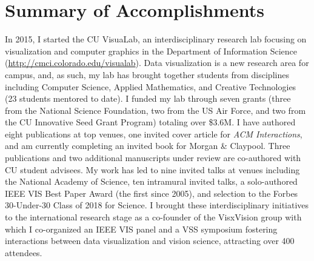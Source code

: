\documentclass[11pt]{article}
\begin{document}

\section*{Summary of Accomplishments}

In 2015, I started the CU VisuaLab, an interdisciplinary research lab focusing on visualization and computer graphics in the Department of Information Science (\href{http://cmci.colorado.edu/visualab}{http://cmci.colorado.edu/visualab}). Data visualization is a new research area for campus, and, as such, my lab has brought together students from disciplines including Computer Science, Applied Mathematics, and Creative Technologies (23 students mentored to date). I funded my lab through seven grants (three from the National Science Foundation, two from the US Air Force, and two from the CU Innovative Seed Grant Program) totaling over \$3.6M. 
I have authored eight publications at top venues, one invited cover article for \emph{ACM Interactions}, and am currently completing an invited book for Morgan \& Claypool. Three publications and two additional manuscripts under review are co-authored with CU student advisees. My work has led to nine invited talks at venues including the National Academy of Science, ten intramural invited talks, a solo-authored IEEE VIS Best Paper Award (the first since 2005), and selection to the Forbes 30-Under-30 Class of 2018 for Science. I brought these interdisciplinary initiatives to the international research stage as a co-founder of the VisxVision group with which I co-organized an IEEE VIS panel and a VSS symposium fostering interactions between data visualization and vision science, attracting over 400 attendees. 
\end{document}
